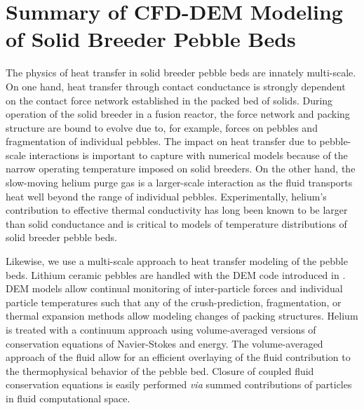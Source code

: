 \FloatBarrier



%
%
\section{Summary of CFD-DEM Modeling of Solid Breeder Pebble Beds}
The physics of heat transfer in solid breeder pebble beds are innately multi-scale. On one hand, heat transfer through contact conductance is strongly dependent on the contact force network established in the packed bed of solids. During operation of the solid breeder in a fusion reactor, the force network and packing structure are bound to evolve due to, for example, forces on pebbles and fragmentation of individual pebbles. The impact on heat transfer due to pebble-scale interactions is important to capture with numerical models because of the narrow operating temperature imposed on solid breeders. On the other hand, the slow-moving helium purge gas is a larger-scale interaction as the fluid transports heat well beyond the range of individual pebbles. Experimentally, helium's contribution to effective thermal conductivity has long been known to be larger than solid conductance and is critical to models of temperature distributions of solid breeder pebble beds.

Likewise, we use a multi-scale approach to heat transfer modeling of the pebble beds. Lithium ceramic pebbles are handled with the DEM code introduced in . DEM models allow continual monitoring of inter-particle forces and individual particle temperatures such that any of the crush-prediction, fragmentation, or thermal expansion methods allow modeling changes of packing structures. Helium is treated with a continuum approach using volume-averaged versions of conservation equations of Navier-Stokes and energy. The volume-averaged approach of the fluid allow for an efficient overlaying of the fluid contribution to the thermophysical behavior of the pebble bed. Closure of coupled fluid conservation equations is easily performed \textit{via} summed contributions of particles in fluid computational space. 


